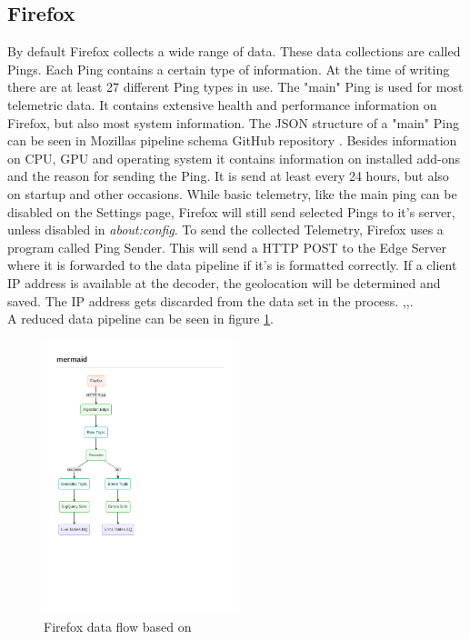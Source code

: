\newpage
\subsection{Firefox}
    By default Firefox collects a wide range of data. These data collections are called Pings. Each Ping contains a certain type of information. At the time of writing there are at least 27 different Ping types in use\cite{mozilla_telemetry_nodate}.
    The "main" Ping is used for most telemetric data. It contains extensive health and performance information on Firefox, but also most system information. The JSON structure of a "main" Ping can be seen in Mozillas pipeline schema GitHub repository \cite{mozilla_mozilla-servicesmozilla-pipeline-schemas_2020}. 
    Besides information on CPU, GPU and operating system it contains information on installed add-ons and the reason for sending the Ping.
    It is send at least every 24 hours, but also on startup and other occasions. While basic telemetry, like the main ping can be disabled on the Settings page, Firefox will still send selected Pings to it's server, unless disabled in \textit{about:config}.
    To send the collected Telemetry, Firefox uses a program called Ping Sender.
    This will send a HTTP POST to the Edge Server where it is forwarded to the data pipeline if it's is formatted correctly.
    If a client IP address is available at the decoder, the geolocation will be determined and saved.
    The IP address gets discarded from the data set in the process. \cite{mozilla_overview_2020},\cite{mozilla_http_2020},\cite{firefox_ping_nodate}.\\
    A reduced data pipeline can be seen in figure \ref{fig:moz_data_flow}.
    
    
    \begin{figure}
        \centering
        \includegraphics[clip, trim=0.5cm 8cm 8cm 3.5cm, width=0.5\textwidth]{latex/figures/firefox_telemetry_graph}
        \caption{Firefox data flow based on \cite{mozilla_overview_2020}}
        \label{fig:moz_data_flow}
    \end{figure}


